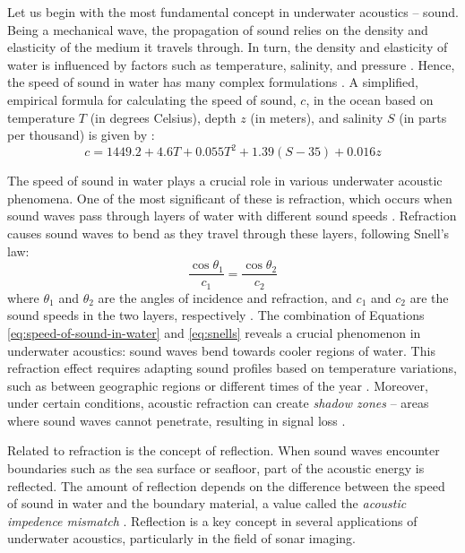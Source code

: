 Let us begin with the most fundamental concept in underwater acoustics -- sound. Being a mechanical wave, the propagation of sound relies on the density and elasticity of the medium it travels through. In turn, the density and elasticity of water is influenced by factors such as temperature, salinity, and pressure \cite{sinay_diving_2024}. Hence, the speed of sound in water has many complex formulations \cite{leroy_new_2008}. A simplified, empirical formula for calculating the speed of sound, $c$, in the ocean based on temperature $T$ (in degrees Celsius), depth $z$ (in meters), and salinity $S$ (in parts per thousand) is given by \cite{abraham_underwater_2019}: 
\begin{equation}
c = 1449.2 + 4.6T + 0.055T^2 + 1.39(S - 35) + 0.016z \label{eq:speed-of-sound-in-water}
\end{equation}

The speed of sound in water plays a crucial role in various underwater acoustic phenomena. One of the most significant of these is refraction, which occurs when sound waves pass through layers of water with different sound speeds \cite{urick_principles_1975}. Refraction causes sound waves to bend as they travel through these layers, following Snell's law:
\begin{equation}
    \frac{\cos \theta_1}{c_1} = \frac{\cos \theta_2}{c_2}\label{eq:snells}
\end{equation}
where $\theta_1$ and $\theta_2$ are the angles of incidence and refraction, and $c_1$ and $c_2$ are the sound speeds in the two layers, respectively \cite{domingos_survey_2022}.  The combination of Equations \ref{eq:speed-of-sound-in-water} and \ref{eq:snells} reveals a crucial phenomenon in underwater acoustics: sound waves bend towards cooler regions of water. This refraction effect requires adapting sound profiles based on temperature variations, such as between geographic regions or different times of the year \cite[3]{domingos_survey_2022}. Moreover, under certain conditions, acoustic refraction can create \textit{shadow zones} -- areas where sound waves cannot penetrate, resulting in signal loss \cite{vaccaro_past_1998}.

Related to refraction is the concept of reflection. When sound waves encounter boundaries such as the sea surface or seafloor, part of the acoustic energy is reflected. The amount of reflection depends on the difference between the speed of sound in water and the boundary material, a value called the \textit{acoustic impedence mismatch} \cite{jackson_high-frequency_2007}. Reflection is a key concept in several applications of underwater acoustics, particularly in the field of sonar imaging. 

